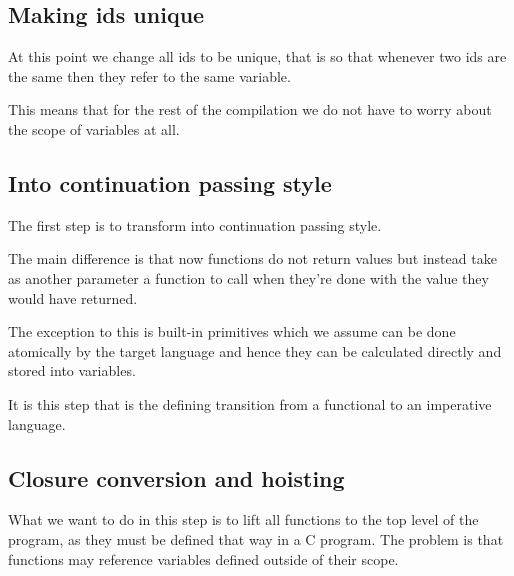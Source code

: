 \documentclass[a4paper]{article}
\begin{document}

\subsection{Making ids unique}

At this point we change all ids to be unique, that is so that whenever two ids are the same then they refer to the same variable.

This means that for the rest of the compilation we do not have to worry about the scope of variables at all.




\subsection{Into continuation passing style}

The first step is to transform into continuation passing style.

The main difference is that now functions do not return values but instead take as another parameter a function to call when they're done with the value they would have returned.

The exception to this is built-in primitives which we assume can be done atomically by the target language and hence they can be calculated directly and stored into variables.

It is this step that is the defining transition from a functional to an imperative language.




\subsection{Closure conversion and hoisting}

What we want to do in this step is to lift all functions to the top level of the program, as they must be defined that way in a C program. The problem is that functions may reference variables defined outside of their scope.
\end{document}
